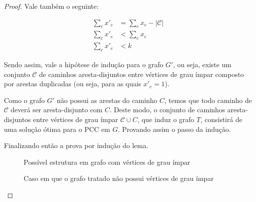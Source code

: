 \begin{proof}
    Vale também o seguinte:

    \begin{align*}
        \sum_e x'_e &= \sum_e x_e - |\mathcal{C}| \\ 
        \sum_e x'_e &< \sum_e x_e \\
        \sum_e x'_e &< k
    \end{align*}

    Sendo assim, vale a hipótese de indução para o grafo $G'$, ou seja, existe um conjunto $\mathcal{C}$ de caminhos aresta-disjuntos entre vértices de grau ímpar composto por arestas duplicadas (ou seja, para as quais $x'_e = 1$).

    Como o grafo $G'$ não possui as arestas do caminho $C$, temos que todo caminho de $\mathcal{C}$ deverá ser aresta-disjunto com $C$.
    Deste modo, o conjunto de caminhos aresta-disjuntos entre vértices de grau ímpar $\mathcal{C} \cup C$, que induz o grafo $T$, consistirá de uma solução ótima para o PCC em $G$.
    Provando assim o passo da indução.

    Finalizando então a prova por indução do lema.

    \begin{figure}
        \centering
        \caption{Possível estrutura em grafo com vértices de grau ímpar}
        \label{pcc-case1}
    \end{figure}
    \begin{figure}
        \centering
        \caption{Caso em que o grafo tratado não possui vértices de grau ímpar}
        \label{pcc-case2}
    \end{figure}

\end{proof}

